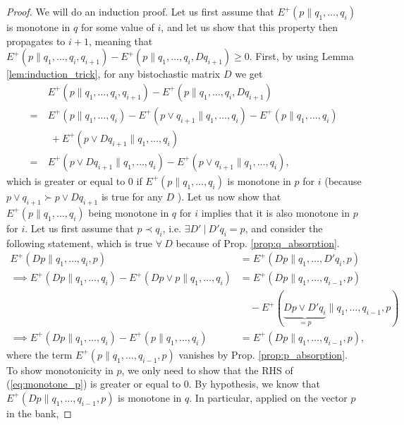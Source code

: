 \begin{proof}
    We will do an induction proof. Let us first assume that $E^+(p \parallel q_1, \dots, q_i)$ is monotone in $q$ for some value of $i$, and let us show that this property then propagates to $i+1$, meaning that $E^+(p \parallel q_1, \dots, q_i, q_{i+1}) - E^+(p \parallel q_1, \dots, q_i, Dq_{i+1}) \geq 0$. First, by using Lemma \ref{lem:induction_trick}, for any bistochastic matrix $D$ we get
    \begin{align}
        &E^+(p \parallel q_1, \dots, q_i, q_{i+1}) - E^+(p \parallel q_1, \dots, q_i, Dq_{i+1})\nonumber \\
        = \: &E^+(p \parallel q_1, \dots, q_i) - E^+(p \vee q_{i+1} \parallel q_1, \dots, q_i) - E^+(p \parallel q_1, \dots, q_i)\nonumber\\
        &\: +  E^+(p \vee Dq_{i+1} \parallel q_1, \dots, q_i)\\
        = \: &E^+(p \vee Dq_{i+1} \parallel q_1, \dots, q_i) - E^+(p \vee q_{i+1} \parallel q_1, \dots, q_i),
    \end{align}
    which is greater or equal to 0 if $E^+(p \parallel q_1, \dots, q_i)$ is monotone in $p$ for $i$ (because $p \vee q_{i+1} \succ p \vee Dq_{i+1}$ is true for any $D$ \cite[p. 35]{davey_introduction_2002}). Let us now show that $E^+(p \parallel q_1, \dots, q_i)$ being monotone in $q$ for $i$ implies that it is also monotone in $p$ for $i$. Let us first assume that $p \prec q_i$, i.e. $\exists D' \: | \: D' q_i = p$, and consider the following statement, which is true $\forall \: D$ because of Prop. \ref{prop:q_absorption}.
    \begin{align}
        E^+(Dp \parallel q_1, \dots, q_i, p) &= E^+(Dp \parallel q_1, \dots, D'q_i, p) \\
        \implies E^+(Dp \parallel q_1, \dots, q_i) - E^+(Dp \vee p \parallel q_1, \dots, q_i) &= E^+(Dp \parallel q_1, \dots, q_{i-1}, p)\nonumber\\
        &\quad - E^+(\underbrace{Dp \vee D'q_i}_{=p} \parallel q_1, \dots, q_{i-1}, p)\\
        \implies E^+(Dp \parallel q_1, \dots, q_i) - E^+(p \parallel q_1, \dots, q_i) &= E^+(Dp \parallel q_1, \dots, q_{i-1}, p), \label{eq:monotone_p}
    \end{align}
    where the term $E^+(p \parallel q_1, \dots, q_{i-1}, p)$ vanishes by Prop. \ref{prop:p_absorption}. To show monotonicity in $p$, we only need to show that the RHS of (\ref{eq:monotone_p}) is greater or equal to 0. By hypothesis, we know that $E^+(Dp \parallel q_1, \dots, q_{i-1}, p)$ is monotone in $q$. In particular, applied on the vector $p$ in the bank,

\end{proof}
